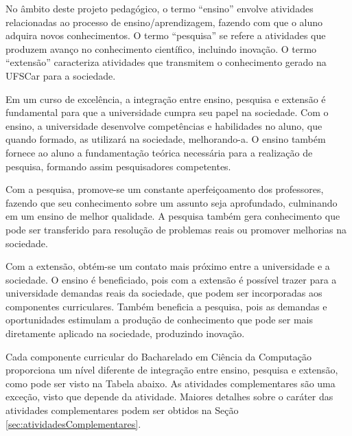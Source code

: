 

No âmbito deste projeto pedagógico, o termo ``ensino'' envolve atividades relacionadas ao processo de ensino/aprendizagem, fazendo com que o aluno adquira novos conhecimentos. O termo ``pesquisa'' se refere a atividades que produzem avanço no conhecimento científico, incluindo inovação. O termo ``extensão'' caracteriza atividades que transmitem o conhecimento gerado na UFSCar para a sociedade.

Em um curso de excelência, a integração entre ensino, pesquisa e extensão é fundamental para que a universidade cumpra seu papel na sociedade. Com o ensino, a universidade desenvolve competências e habilidades no aluno, que quando formado, as utilizará na sociedade, melhorando-a. O ensino também fornece ao aluno a fundamentação teórica necessária para a realização de pesquisa, formando assim pesquisadores competentes.

Com a pesquisa, promove-se um constante aperfeiçoamento dos professores, fazendo que seu conhecimento sobre um assunto seja aprofundado, culminando em um ensino de melhor qualidade. A pesquisa também gera conhecimento que pode ser transferido para resolução de problemas reais ou promover melhorias na sociedade.

Com a extensão, obtém-se um contato mais próximo entre a universidade e a sociedade. O ensino é beneficiado, pois com a extensão é possível trazer para a universidade demandas reais da sociedade, que podem ser incorporadas aos componentes curriculares. Também beneficia a pesquisa, pois as demandas e oportunidades estimulam a produção de conhecimento que pode ser mais diretamente aplicado na sociedade, produzindo inovação.

Cada componente curricular do Bacharelado em Ciência da Computação proporciona um nível diferente de integração entre ensino, pesquisa e extensão, como pode ser visto na Tabela abaixo. As atividades complementares são uma exceção, visto que depende da atividade. Maiores detalhes sobre o caráter das atividades complementares podem ser obtidos na Seção \ref{sec:atividadesComplementares}.

